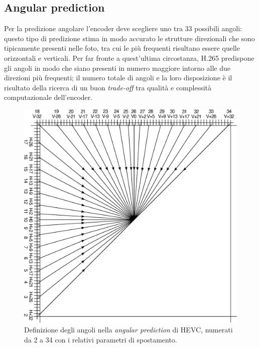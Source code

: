 \subsection{Angular prediction}
Per la predizione angolare l'encoder deve scegliere uno tra 33 possibili angoli:
 questo tipo di predizione stima in modo accurato le strutture direzionali che 
sono tipicamente presenti nelle foto, tra cui le più frequenti risultano essere
 quelle orizzontali e verticali.
Per far fronte a quest'ultima circostanza, H.265 predispone gli angoli in modo 
che siano presenti in numero maggiore intorno alle due direzioni più frequenti;
 il numero totale di angoli e la loro disposizione è il risultato della ricerca 
di un buon \emph{trade-off} tra qualità e complessità computazionale 
dell'encoder.

\begin{figure}[H]
  \centering
  \captionsetup{justification=raggedright}
  \includegraphics[scale=0.6]{Figures/Angular_prediction}
  \caption[Definizione degli angoli nella \emph{angular prediction}]
	  {Definizione degli angoli nella \emph{angular prediction} di HEVC,
           numerati da 2 a 34 con i relativi parametri di spostamento.}
\end{figure}

